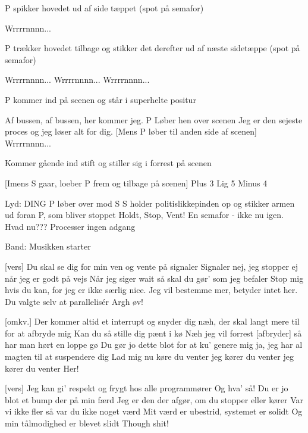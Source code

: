 \documentclass[a4paper,11pt]{article}
\begin{document}
\begin{song}
\scene P spikker hovedet ud af side tæppet (spot på semafor)

 Wrrrrnnnn...

\scene P trækker hovedet tilbage og stikker det derefter ud af næste sidetæppe (spot på semafor)

 Wrrrrnnnn... Wrrrrnnnn... Wrrrrnnnn...

\scene P kommer ind på scenen og står i superhelte positur

 Af bussen, af bussen, her kommer jeg.
\scene P Løber hen over scenen
 Jeg er den sejeste proces og jeg løser alt for dig.
[Mens P løber til anden side af scenen] Wrrrrnnnn...

 Kommer gående ind stift og stiller sig i forrest på scenen

[Imens S gaar, loeber P frem og tilbage på scenen] {Plus 3 Lig 5 Minus 4} 

\scene Lyd: DING
\scene P løber over mod S
\scene S holder politislikkepinden op og stikker armen ud foran P, som bliver stoppet
 Holdt, Stop, Vent!
 En semafor - ikke nu igen. Hvad nu???
 Processer ingen adgang

\scene Band: Musikken starter

[vers] Du skal se dig for min ven og vente på signaler
 Signaler nej, jeg stopper ej når jeg er godt på vejs
 Når jeg siger wait så skal du gør' som jeg befaler
 Stop mig hvis du kan, for jeg er ikke særlig nice.
          Jeg vil bestemme mer,
 betyder intet her. Du valgte selv at parallelisér
 Argh øv!

[omkv.] Der kommer altid et interrupt og snyder dig
 næh, der skal langt mere til for at afbryde mig
 Kan du så stille dig pænt i kø
 Næh jeg vil forrest
[afbryder] så har man hørt en loppe gø
 Du gør jo dette blot for at ku' genere mig
 ja, jeg har al magten til at suspendere dig
 Lad mig nu køre
 du venter
 jeg kører
 du venter
 jeg kører
 du venter Her!

[vers] Jeg kan gi' respekt og frygt hos alle programmører
 Og hva' så! Du er jo blot et bump der på min færd
 Jeg er den der afgør, om du stopper eller kører
 Var vi ikke fler så var du ikke noget værd
 Mit værd er ubestrid, systemet er solidt
 Og min tålmodighed er blevet slidt
 Though shit!


\end{song}
\end{document}
